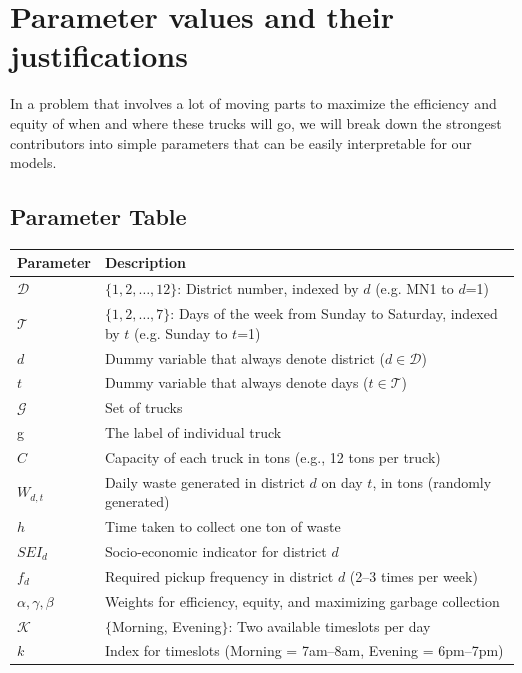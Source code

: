 \documentclass{article}
\begin{document}
\newpage

\section{Parameter values and their justifications}
In a problem that involves a lot of moving parts to maximize the efficiency and equity of when and where these trucks will go, we will break down the strongest contributors into simple parameters that can be easily interpretable for our models. 

\subsection{Parameter Table}

\begin{table}[h]
\begin{tabular}{|p{}|p{}|}
\hline
\textbf{Parameter} & \textbf{Description} \\
\hline
$\mathcal{D}$ & $\{1,2,\ldots,12\}$: District number, indexed by $d$ (e.g. MN1 to $d$=1)\\
\hline
$\mathcal{T}$ & $\{1,2,\ldots,7\}$: Days of the week from Sunday to Saturday, indexed by $t$ (e.g. Sunday to $t$=1)\\
\hline
$d$ & Dummy variable that always denote district ($d \in \mathcal{D}$) \\
\hline
$t$ & Dummy variable that always denote days ($t \in \mathcal{T}$)\\
\hline
$\mathcal{G}$ & Set of trucks \\
\hline
g & The label of individual truck\\
\hline
$C$ & Capacity of each truck in tons (e.g., 12 tons per truck) \\
\hline
$W_{d,t}$ & Daily waste generated in district $d$ on day $t$, in tons (randomly generated) \\
\hline
$h$ & Time taken to collect one ton of waste \\
\hline
$SEI_d$ & Socio-economic indicator for district $d$ \\
\hline
$f_d$ & Required pickup frequency in district $d$ (2--3 times per week) \\
\hline
$\alpha,\gamma,\beta$ & Weights for efficiency, equity, and maximizing garbage collection \\
\hline
$\mathcal{K}$ & $\{$Morning, Evening$\}$: Two available timeslots per day \\
\hline
$k$ & Index for timeslots (Morning = 7am--8am, Evening = 6pm--7pm) \\

\end{tabular}
\end{table}
\end{document}
